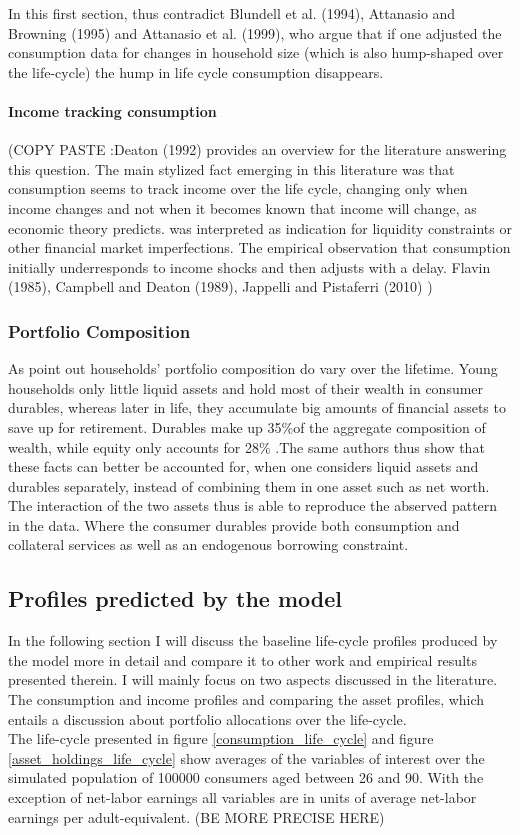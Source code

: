 \documentclass[a4paper,12pt]{article}
\begin{document}
In this first section, \cite{FV&K2011} thus contradict Blundell et al. (1994), Attanasio and Browning (1995) and Attanasio et al. (1999), who argue that if one adjusted the consumption data for changes in household size (which is also hump-shaped over the life-cycle) the hump in life cycle consumption disappears. 

\paragraph{Income tracking consumption}

(COPY PASTE :Deaton (1992) provides an overview for the literature answering this question. The main stylized fact emerging in this literature was that consumption seems to track income over the life cycle, changing only when income changes and not when it becomes known that income will change, as economic theory predicts. was interpreted as indication for liquidity constraints or other financial market imperfections. The empirical observation that consumption initially underresponds to income shocks and then adjusts with a delay. Flavin (1985), Campbell and Deaton (1989), Jappelli and Pistaferri (2010) )

\subsubsection{Portfolio Composition} 
As \cite{FV&K2011} point out households' portfolio composition do vary over the lifetime. Young households only little liquid assets and hold most of their wealth in consumer durables, whereas later in life, they accumulate big amounts of financial assets to save up for retirement. Durables make up 35\%of the aggregate composition of wealth, while equity only accounts for 28\% \citep{FV&K2011}.The same authors thus show that these facts can better be accounted for, when one considers liquid assets and durables separately, instead of combining them in one asset such as net worth. The interaction of the two assets thus is able to reproduce the abserved pattern in the data. Where the consumer durables provide both consumption and collateral services as well as an endogenous borrowing constraint. 

\subsection{Profiles predicted by the model}

In the following section I will discuss the baseline life-cycle profiles produced by the model more in detail and compare it to other work and empirical results presented therein. I will mainly focus on two aspects discussed in the literature. The consumption and income profiles and comparing the asset profiles, which entails a discussion about portfolio allocations over the life-cycle. \\
The life-cycle presented in figure \ref{consumption_life_cycle} and figure \ref{asset_holdings_life_cycle} show averages of the variables of interest over the simulated population of 100000 consumers aged between 26 and 90. With the exception of net-labor earnings all variables are in units of average net-labor earnings per adult-equivalent. (BE MORE PRECISE HERE) 
\end{document}
